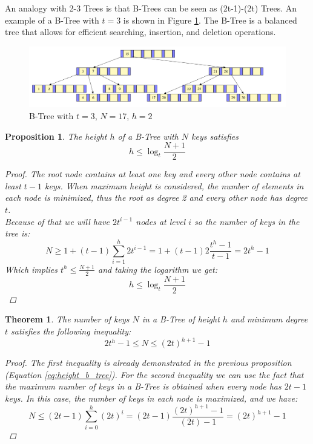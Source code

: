 \documentclass{report}
\newtheorem{prop}{Proposition}[chapter]
\newtheorem{teo}{Theorem}[chapter]
\begin{document}
\noindent
An analogy with 2-3 Trees is that B-Trees can be seen as (2t-1)-(2t) Trees. An example of a B-Tree with \( t=3 \) is shown in Figure \ref{fig:b_tree}. The B-Tree is a balanced tree that allows for efficient searching, insertion, and deletion operations.
\begin{figure}
    \centering
    \includegraphics[width=1\textwidth]{img/btree.PNG}
    \caption{B-Tree with \(t=3\), \(N=17\), \(h=2\)}
    \label{fig:b_tree}
\end{figure}
\begin{prop}
    The height \(h\) of a B-Tree with \(N\) keys satisfies
    \begin{equation}
        h \leq \log_{t} \frac{N+1}{2}
    \end{equation}
    \begin{proof}
        The root node contains at least one key and every other node contains at least \(t-1\) keys. When maximum height is considered, the number of elements in each node is minimized, thus the root as degree 2 and every other node has degree \(t\).\\
        Because of that we will have \(2 t^{i-1}\) nodes at level \(i\) so the number of keys in the tree is:
        \begin{equation} \label{eq:height_b_tree}
            N \geq 1 + (t-1)\sum_{i=1}^{h} 2t^{i-1} = 1 + (t-1) 2 \frac{t^h - 1}{t - 1} = 2t^h - 1
        \end{equation}
        \noindent Which implies \(t^h \leq \frac{N+1}{2}\) and taking the logarithm we get:
        \begin{equation}
            h \leq \log_{t} \frac{N+1}{2}
        \end{equation}
    \end{proof}
\end{prop}
\begin{teo}
    The number of keys \(N\) in a B-Tree of height \(h\) and minimum degree \(t\) satisfies the following inequality:
    \begin{equation}
        2t^h - 1 \leq N \leq (2t)^{h+1} - 1
    \end{equation}
    \begin{proof}
        The first inequality is already demonstrated in the previous proposition (Equation \ref{eq:height_b_tree}).
        \noindent For the second inequality we can use the fact that the maximum number of keys in a B-Tree is obtained when every node has \(2t-1\) keys. In this case, the number of keys in each node is maximized, and we have:
        \begin{equation}
            N \leq (2t-1) \sum_{i=0}^{h} (2t)^i = (2t-1) \frac{(2t)^{h+1} - 1}{(2t) - 1} = (2t)^{h+1} - 1
        \end{equation}
    \end{proof}
\end{teo}
\end{document}
